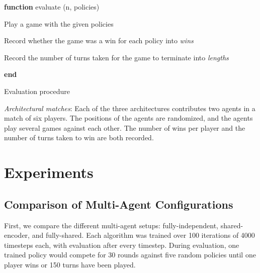 \documentclass[12pt, a4paper, twocolumn]{article}
\begin{document}
\begin{algorithm}

  \textbf{function} evaluate (n, policies)

  \Indp
  

   {
    Play a game with the given policies

    Record whether the game was a win for each policy into \textit{wins}

    Record the number of turns taken for the game to terminate into \textit{lengths}
  }


  \Indm

  \textbf{end}

  
  \caption{Evaluation procedure}
\end{algorithm}

\textit{Architectural matches}: Each of the three architectures contributes two agents in a match of six players. The positions of the agents are randomized, and the agents play several games against each other. The number of wins per player and the number of turns taken to win are both recorded.


\section{Experiments}

\subsection{Comparison of Multi-Agent Configurations}

First, we compare the different multi-agent setups: fully-independent, shared-encoder, and fully-shared. Each algorithm was trained over 100 iterations of 4000 timesteps each, with evaluation after every timestep. During evaluation, one trained policy would compete for 30 rounds against five random policies until one player wins or 150 turns have been played.
\end{document}
